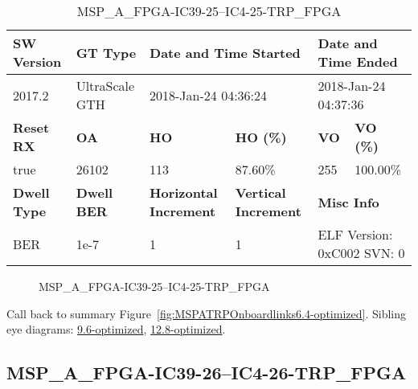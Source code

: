 \begin{table}[h]
\centering
\caption{MSP\_A\_FPGA-IC39-25--IC4-25-TRP\_FPGA}
\label{tab:MSPAFPGAIC3925IC425TRPFPGA6.4-optimized}
\begin{tabular}{@{}|l|l|l|l|l|l|@{}}
\toprule
\textbf{SW Version}                & \textbf{GT Type}   & \multicolumn{2}{l|}{\textbf{Date and Time Started}}            & \multicolumn{2}{l|}{\textbf{Date and Time Ended}}        \\ \midrule
2017.2                       & UltraScale GTH          & \multicolumn{2}{l|}{2018-Jan-24 04:36:24}                   & \multicolumn{2}{l|}{2018-Jan-24 04:37:36}               \\ \midrule
\textbf{Reset RX}                  & \textbf{OA} & \textbf{HO}   & \textbf{HO (\%)} & \textbf{VO} & \textbf{VO (\%)} \\ \midrule
true & 26102        & 113          & 87.60\%        & 255        & 100.00\%       \\ \midrule
\textbf{Dwell Type}                & \textbf{Dwell BER} & \textbf{Horizontal Increment} & \textbf{Vertical Increment}    & \multicolumn{2}{l|}{\textbf{Misc Info}}                  \\ \midrule
BER                            & 1e-7        & 1        & 1           & \multicolumn{2}{l|}{ELF Version: 0xC002 SVN: 0}                         \\ \bottomrule
\end{tabular}
\end{table}

\begin{figure}[h]
\caption{MSP\_A\_FPGA-IC39-25--IC4-25-TRP\_FPGA} \label{fig:MSPAFPGAIC3925IC425TRPFPGA6.4-optimized}
\end{figure}

Call back to summary Figure~\ref{fig:MSPATRPOnboardlinks6.4-optimized}.
Sibling eye diagrams: \hyperref[sec:MSPAFPGAIC3925IC425TRPFPGA9.6-optimized]{9.6-optimized}, \hyperref[sec:MSPAFPGAIC3925IC425TRPFPGA12.8-optimized]{12.8-optimized}.

\clearpage
\newpage


\subsection{MSP\_A\_FPGA-IC39-26--IC4-26-TRP\_FPGA}\label{sec:MSPAFPGAIC3926IC426TRPFPGA6.4-optimized}

